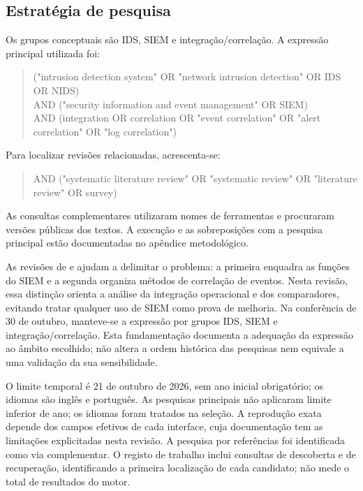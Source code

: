 \documentclass[11pt,a4paper]{article}
\begin{document}
\subsection{Estratégia de pesquisa}
Os grupos conceptuais são IDS, SIEM e integração/correlação. A expressão principal utilizada foi:
\begin{quote}\small\ttfamily\raggedright
("intrusion detection system" OR "network intrusion detection" OR IDS OR NIDS)\\
AND ("security information and event management" OR SIEM)\\
AND (integration OR correlation OR "event correlation" OR "alert correlation" OR "log correlation")
\end{quote}
Para localizar revisões relacionadas, acrescenta-se:
\begin{quote}\small\ttfamily\raggedright
AND ("systematic literature review" OR "systematic review" OR "literature review" OR survey)
\end{quote}
As consultas complementares utilizaram nomes de ferramentas e procuraram versões públicas dos textos. A execução e as sobreposições com a pesquisa principal estão documentadas no apêndice metodológico.

As revisões de \citet{gonzalez2021} e \citet{kotenko2022} ajudam a delimitar o problema: a primeira enquadra as funções do SIEM e a segunda organiza métodos de correlação de eventos. Nesta revisão, essa distinção orienta a análise da integração operacional e dos comparadores, evitando tratar qualquer uso de SIEM como prova de melhoria. Na conferência de 30 de outubro, manteve-se a expressão por grupos IDS, SIEM e integração/correlação. Esta fundamentação documenta a adequação da expressão ao âmbito escolhido; não altera a ordem histórica das pesquisas nem equivale a uma validação da sua sensibilidade.

O limite temporal é 21 de outubro de 2026, sem ano inicial obrigatório; os idiomas são inglês e português. As pesquisas principais não aplicaram limite inferior de ano; os idiomas foram tratados na seleção. A reprodução exata depende dos campos efetivos de cada interface, cuja documentação tem as limitações explicitadas nesta revisão. A pesquisa por referências foi identificada como via complementar. O registo de trabalho inclui consultas de descoberta e de recuperação, identificando a primeira localização de cada candidato; não mede o total de resultados do motor.
\end{document}
